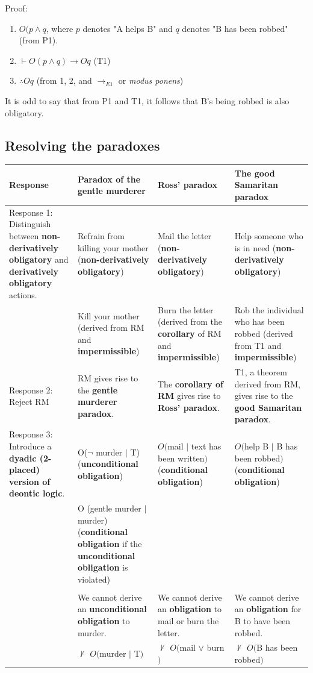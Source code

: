 \documentclass[11pt]{article}
\begin{document}
Proof:
\begin{enumerate}
\item \(O(p \wedge q\), where \(p\) denotes "A helps B" and \(q\) denotes "B has been robbed" (from P1).
\item \(\vdash O(p \wedge q) \rightarrow Oq\) (T1)
\item \(\therefore Oq\) (from 1, 2, and \(\rightarrow_{E1}\) or \emph{modus ponens})
\end{enumerate}

It is odd to say that from P1 and T1, it follows that B's being robbed is also obligatory.
\subsection{Resolving the paradoxes}
\label{sec:org402bc7e}
\begin{center}
\begin{tabularx}{1.2\textwidth}{|X|X|X|X|}
\hline
Response & Paradox of the gentle murderer & Ross' paradox & The good Samaritan paradox\\
\hline
Response 1: Distinguish between \textbf{non-derivatively obligatory} and \textbf{derivatively obligatory} actions. & Refrain from killing your mother (\textbf{non-derivatively obligatory}) & Mail the letter (\textbf{non-derivatively obligatory}) & Help someone who is in need (\textbf{non-derivatively obligatory})\\
 & Kill your mother (derived from RM and \textbf{impermissible}) & Burn the letter (derived from the \textbf{corollary} of RM and \textbf{impermissible}) & Rob the individual who has been robbed (derived from T1 and \textbf{impermissible})\\
\hline
Response 2: Reject RM & RM gives rise to the \textbf{gentle murderer paradox}. & The \textbf{corollary of RM} gives rise to \textbf{Ross' paradox}. & T1, a theorem derived from RM, gives rise to the \textbf{good Samaritan paradox}.\\
\hline
Response 3: Introduce a \textbf{dyadic (2-placed) version of deontic logic}. & O(\(\neg\) murder \(\vert\) T) (\textbf{unconditional obligation}) & \(O(\)mail \(\vert\) text has been written\()\) (\textbf{conditional obligation}) & \(O(\)help B \(\vert\) B has been robbed\()\) (\textbf{conditional obligation})\\
 & O (gentle murder \(\vert\) murder) (\textbf{conditional obligation} if the \textbf{unconditional obligation} is violated) &  & \\
 &  &  & \\
 & We cannot derive an \textbf{unconditional obligation} to murder. & We cannot derive an \textbf{obligation} to mail or burn the letter. & We cannot derive an \textbf{obligation} for B to have been robbed.\\
 & \(\nvdash\) \(O(\)murder \(\vert\) T\()\) & \(\nvdash\) \(O(\)mail \(\vee\) burn\()\) & \(\nvdash\) \(O(\)B has been robbed\()\)\\
\hline
\end{tabularx}
\end{center}
\end{document}
